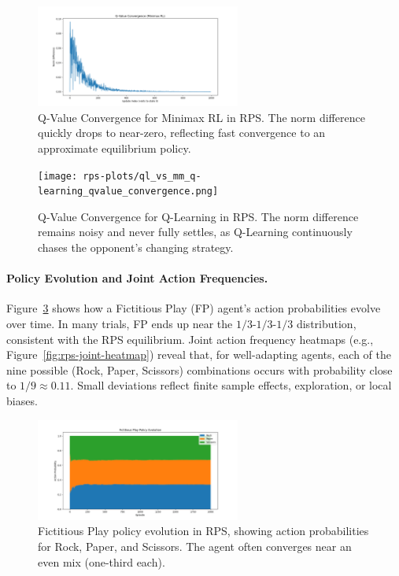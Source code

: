 \documentclass[11pt]{article}
\begin{document}
\begin{figure}[htbp]
    \centering
    \includegraphics[width=0.6\textwidth]{rps-plots/ql_vs_mm_minimax_rl_qvalue_convergence.png}
    \caption{Q-Value Convergence for Minimax RL in RPS. The norm difference 
    quickly drops to near-zero, reflecting fast convergence to an 
    approximate equilibrium policy.}
    \label{fig:rps-minimax-convergence}
\end{figure}

\begin{figure}[htbp]
    \centering
    \texttt{[image: rps-plots/ql\_vs\_mm\_q-learning\_qvalue\_convergence.png]}
    \caption{Q-Value Convergence for Q-Learning in RPS. The norm difference 
    remains noisy and never fully settles, as Q-Learning continuously 
    chases the opponent's changing strategy.}
    \label{fig:rps-ql-convergence}
\end{figure}

\paragraph{Policy Evolution and Joint Action Frequencies.}
Figure~\ref{fig:rps-fp-policy} shows how a Fictitious Play (FP) agent's 
action probabilities evolve over time. In many trials, FP ends up near 
the $1/3$-$1/3$-$1/3$ distribution, consistent with the RPS equilibrium. 
Joint action frequency heatmaps 
(e.g., Figure~\ref{fig:rps-joint-heatmap}) reveal that, for well-adapting 
agents, each of the nine possible (Rock, Paper, Scissors) combinations 
occurs with probability close to $1/9 \approx 0.11$. Small deviations 
reflect finite sample effects, exploration, or local biases.

\begin{figure}[htbp]
    \centering
    \includegraphics[width=0.6\textwidth]{rps-plots/fp_vs_mm_fictitious_play_policy_evolution.png}
    \caption{Fictitious Play policy evolution in RPS, showing action 
    probabilities for Rock, Paper, and Scissors. The agent often converges 
    near an even mix (one-third each).}
    \label{fig:rps-fp-policy}
\end{figure}
\end{document}
